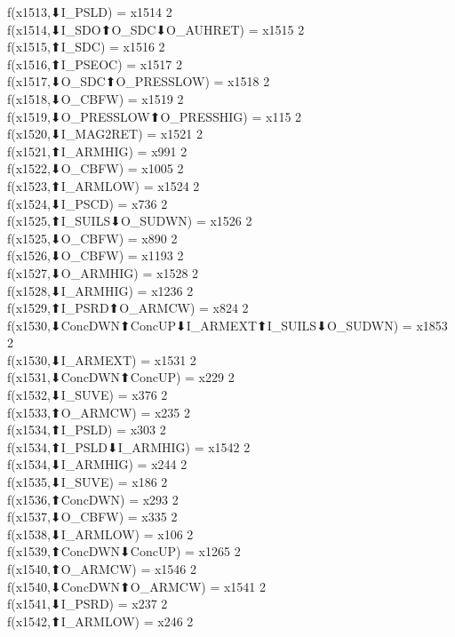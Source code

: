 f(x1513,⬇I_PSLD) = x1514 {2} \\
f(x1514,⬇I_SDO⬆O_SDC⬇O_AUHRET) = x1515 {2} \\
f(x1515,⬆I_SDC) = x1516 {2} \\
f(x1516,⬆I_PSEOC) = x1517 {2} \\
f(x1517,⬇O_SDC⬆O_PRESSLOW) = x1518 {2} \\
f(x1518,⬇O_CBFW) = x1519 {2} \\
f(x1519,⬇O_PRESSLOW⬆O_PRESSHIG) = x115 {2} \\
f(x1520,⬇I_MAG2RET) = x1521 {2} \\
f(x1521,⬆I_ARMHIG) = x991 {2} \\
f(x1522,⬇O_CBFW) = x1005 {2} \\
f(x1523,⬆I_ARMLOW) = x1524 {2} \\
f(x1524,⬇I_PSCD) = x736 {2} \\
f(x1525,⬆I_SUILS⬇O_SUDWN) = x1526 {2} \\
f(x1525,⬇O_CBFW) = x890 {2} \\
f(x1526,⬇O_CBFW) = x1193 {2} \\
f(x1527,⬇O_ARMHIG) = x1528 {2} \\
f(x1528,⬇I_ARMHIG) = x1236 {2} \\
f(x1529,⬆I_PSRD⬆O_ARMCW) = x824 {2} \\
f(x1530,⬇ConcDWN⬆ConcUP⬇I_ARMEXT⬆I_SUILS⬇O_SUDWN) = x1853 {2} \\
f(x1530,⬇I_ARMEXT) = x1531 {2} \\
f(x1531,⬇ConcDWN⬆ConcUP) = x229 {2} \\
f(x1532,⬇I_SUVE) = x376 {2} \\
f(x1533,⬆O_ARMCW) = x235 {2} \\
f(x1534,⬆I_PSLD) = x303 {2} \\
f(x1534,⬆I_PSLD⬇I_ARMHIG) = x1542 {2} \\
f(x1534,⬇I_ARMHIG) = x244 {2} \\
f(x1535,⬇I_SUVE) = x186 {2} \\
f(x1536,⬆ConcDWN) = x293 {2} \\
f(x1537,⬇O_CBFW) = x335 {2} \\
f(x1538,⬇I_ARMLOW) = x106 {2} \\
f(x1539,⬆ConcDWN⬇ConcUP) = x1265 {2} \\
f(x1540,⬆O_ARMCW) = x1546 {2} \\
f(x1540,⬇ConcDWN⬆O_ARMCW) = x1541 {2} \\
f(x1541,⬇I_PSRD) = x237 {2} \\
f(x1542,⬆I_ARMLOW) = x246 {2} \\
